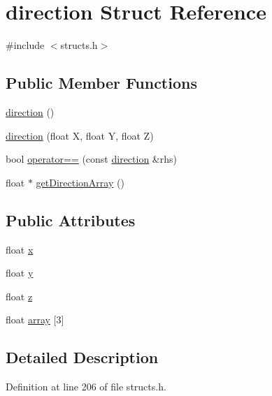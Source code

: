 \hypertarget{structdirection}{}\section{direction Struct Reference}
\label{structdirection}


{\ttfamily \#include $<$structs.\+h$>$}

\subsection*{Public Member Functions}
\begin{DoxyCompactItemize}
\item 
\mbox{\hyperlink{structdirection_aec63de1bc5de2b04a10ba05ccf5d1e5c}{direction}} ()
\item 
\mbox{\hyperlink{structdirection_aa110e167446e56347dae0ec110acd666}{direction}} (float X, float Y, float Z)
\item 
bool \mbox{\hyperlink{structdirection_a07af488d6fa8d5b140fedf087f6d62d9}{operator==}} (const \mbox{\hyperlink{structdirection}{direction}} \&rhs)
\item 
float $\ast$ \mbox{\hyperlink{structdirection_af1cd0f36bb6f2ed44c2adc4599288b28}{get\+Direction\+Array}} ()
\end{DoxyCompactItemize}
\subsection*{Public Attributes}
\begin{DoxyCompactItemize}
\item 
float \mbox{\hyperlink{structdirection_a19fc7fb15e44643c1816108b180c875c}{x}}
\item 
float \mbox{\hyperlink{structdirection_a8b42de830050ebb6df61e00178677d4a}{y}}
\item 
float \mbox{\hyperlink{structdirection_a417fbafba9a383aaf1bb843e540c5f95}{z}}
\item 
float \mbox{\hyperlink{structdirection_a63c93cc6656f46d483d80a6fbbd2f5b0}{array}} \mbox{[}3\mbox{]}
\end{DoxyCompactItemize}


\subsection{Detailed Description}


Definition at line 206 of file structs.\+h.



